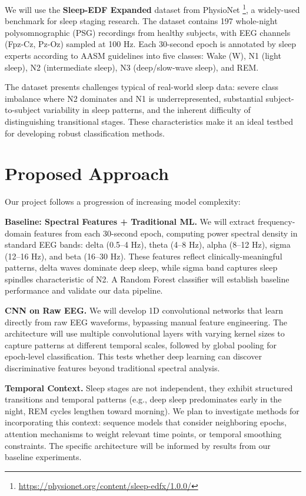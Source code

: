 \documentclass[final]{article}
\begin{document}
We will use the \textbf{Sleep-EDF Expanded} dataset from PhysioNet \cite{SleepEDF2018, Goldberger2000}\footnote{\url{https://physionet.org/content/sleep-edfx/1.0.0/}}, a widely-used benchmark for sleep staging research. The dataset contains 197 whole-night polysomnographic (PSG) recordings from healthy subjects, with EEG channels (Fpz-Cz, Pz-Oz) sampled at 100 Hz. Each 30-second epoch is annotated by sleep experts according to AASM guidelines into five classes: Wake (W), N1 (light sleep), N2 (intermediate sleep), N3 (deep/slow-wave sleep), and REM.

The dataset presents challenges typical of real-world sleep data: severe class imbalance where N2 dominates and N1 is underrepresented, substantial subject-to-subject variability in sleep patterns, and the inherent difficulty of distinguishing transitional stages. These characteristics make it an ideal testbed for developing robust classification methods.

\section{Proposed Approach}

Our project follows a progression of increasing model complexity:

\textbf{Baseline: Spectral Features + Traditional ML.} We will extract frequency-domain features from each 30-second epoch, computing power spectral density in standard EEG bands: delta (0.5--4 Hz), theta (4--8 Hz), alpha (8--12 Hz), sigma (12--16 Hz), and beta (16--30 Hz). These features reflect clinically-meaningful patterns, delta waves dominate deep sleep, while sigma band captures sleep spindles characteristic of N2. A Random Forest classifier will establish baseline performance and validate our data pipeline.

\textbf{CNN on Raw EEG.} We will develop 1D convolutional networks that learn directly from raw EEG waveforms, bypassing manual feature engineering. The architecture will use multiple convolutional layers with varying kernel sizes to capture patterns at different temporal scales, followed by global pooling for epoch-level classification. This tests whether deep learning can discover discriminative features beyond traditional spectral analysis.

\textbf{Temporal Context.} Sleep stages are not independent, they exhibit structured transitions and temporal patterns (e.g., deep sleep predominates early in the night, REM cycles lengthen toward morning). We plan to investigate methods for incorporating this context: sequence models that consider neighboring epochs, attention mechanisms to weight relevant time points, or temporal smoothing constraints. The specific architecture will be informed by results from our baseline experiments.
\end{document}
